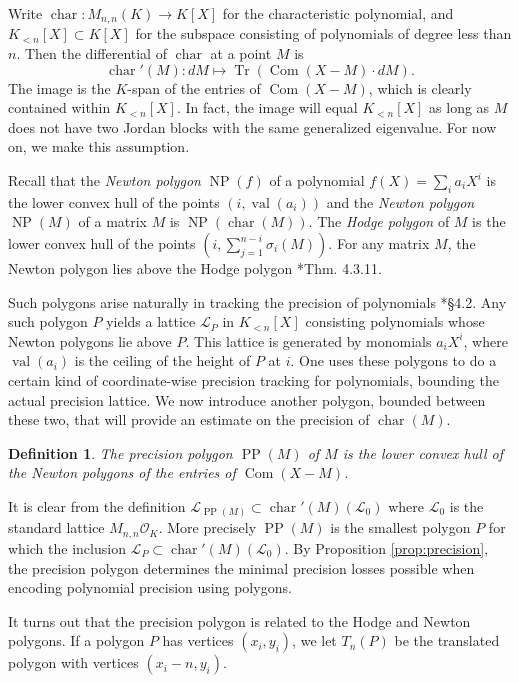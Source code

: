 \documentclass{sig-alternate}
\DeclareMathOperator{\NP}{NP}
\DeclareMathOperator{\PP}{PP}
\DeclareMathOperator{\val}{val}
\DeclareMathOperator{\tr}{Tr}
\DeclareMathOperator{\com}{Com}
\newtheorem{deftn}[theo]{Definition}
\newcommand{\OK}{\mathcal{O}_K}
\DeclareMathOperator{\charpoly}{char}
\newcommand{\charp}{\charpoly'}
\begin{document}
Write $\charpoly : M_{n,n}(K) \to K[X]$ for the characteristic 
polynomial, and $K_{<n}[X] \subset K[X]$ for the subspace consisting of 
polynomials of degree less than $n$.  Then the differential of 
$\charpoly$ at a point $M$ is
\[
\charp(M) : dM \mapsto \tr(\com(X - M) \cdot dM).
\]
The image is the $K$-span of the entries of $\com(X{-}M)$, which is 
clearly contained within $K_{<n}[X]$.  In fact, the image will equal 
$K_{<n}[X]$ as long as $M$ does not have two Jordan blocks with the same 
generalized eigenvalue. For now on, we make this assumption.

Recall that the \emph{Newton polygon} $\NP(f)$ of a polynomial $f(X) = 
\sum_{i} a_i X^i$ is the lower convex hull of the points $(i, 
\val(a_i))$ and the \emph{Newton polygon} $\NP(M)$ of a matrix $M$ is 
$\NP(\charpoly(M))$.  The \emph{Hodge polygon} of $M$ is the lower 
convex hull of the points $(i, \sum_{j = 1}^{n-i} \sigma_i(M))$. For 
any matrix $M$, the Newton polygon lies above the Hodge polygon 
\cite{kedlaya:padicDiffEq}*{Thm. 4.3.11}.

Such polygons arise naturally in tracking the precision of polynomials 
\cite{caruso-roe-vaccon:14a}*{\S 4.2}.  Any such polygon $P$ yields a 
lattice $\mathcal{L}_P$ in $K_{<n}[X]$ consisting polynomials whose 
Newton polygons lie above $P$.  This lattice is generated by monomials 
$a_iX^i$, where $\val(a_i)$ is the ceiling of the height of $P$ at $i$.  
One uses these polygons to do a certain kind of coordinate-wise 
precision tracking for polynomials, bounding the actual precision 
lattice. We now introduce another polygon, bounded 
between these two, that will provide an estimate on the precision of $\charpoly(M)$.

\begin{deftn}
The \emph{precision polygon} $\PP(M)$ of $M$ is the lower convex hull of 
the Newton polygons of the entries of $\com(X{-}M)$.
\end{deftn}

It is clear from the definition $\mathcal L_{\PP(M)} \subset 
\charp(M)(\mathcal{L}_0)$ where $\mathcal{L}_0$ is the standard lattice 
$M_{n,n}{\OK}$. More precisely $\PP(M)$ is the smallest polygon $P$ for 
which the inclusion $\mathcal L_P \subset \charp(M)(\mathcal{L}_0)$. By 
Proposition \ref{prop:precision}, the precision polygon determines the minimal 
precision losses possible when encoding polynomial precision using polygons.

It turns out that the precision polygon is related to the Hodge and Newton 
polygons. If a polygon $P$ has vertices $(x_i, y_i)$, we let $T_n(P)$ be 
the translated polygon with vertices $(x_i - n, y_i)$.
\end{document}
